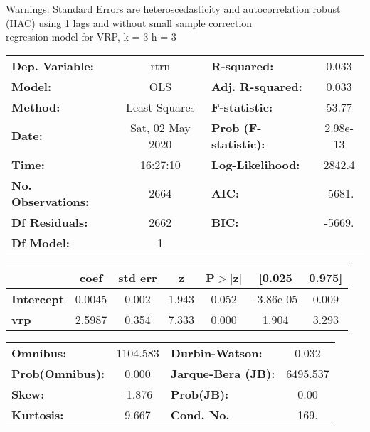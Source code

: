 Warnings: \newline
 [1] Standard Errors are heteroscedasticity and autocorrelation robust (HAC) using 1 lags and without small sample correction\\ 

regression model for VRP, k = 3 h = 3\begin{center}
\begin{tabular}{lclc}
\toprule
\textbf{Dep. Variable:}    &       rtrn       & \textbf{  R-squared:         } &     0.033   \\
\textbf{Model:}            &       OLS        & \textbf{  Adj. R-squared:    } &     0.033   \\
\textbf{Method:}           &  Least Squares   & \textbf{  F-statistic:       } &     53.77   \\
\textbf{Date:}             & Sat, 02 May 2020 & \textbf{  Prob (F-statistic):} &  2.98e-13   \\
\textbf{Time:}             &     16:27:10     & \textbf{  Log-Likelihood:    } &    2842.4   \\
\textbf{No. Observations:} &        2664      & \textbf{  AIC:               } &    -5681.   \\
\textbf{Df Residuals:}     &        2662      & \textbf{  BIC:               } &    -5669.   \\
\textbf{Df Model:}         &           1      & \textbf{                     } &             \\
\bottomrule
\end{tabular}
\begin{tabular}{lcccccc}
                   & \textbf{coef} & \textbf{std err} & \textbf{z} & \textbf{P$> |$z$|$} & \textbf{[0.025} & \textbf{0.975]}  \\
\midrule
\textbf{Intercept} &       0.0045  &        0.002     &     1.943  &         0.052        &    -3.86e-05    &        0.009     \\
\textbf{vrp}       &       2.5987  &        0.354     &     7.333  &         0.000        &        1.904    &        3.293     \\
\bottomrule
\end{tabular}
\begin{tabular}{lclc}
\textbf{Omnibus:}       & 1104.583 & \textbf{  Durbin-Watson:     } &    0.032  \\
\textbf{Prob(Omnibus):} &   0.000  & \textbf{  Jarque-Bera (JB):  } & 6495.537  \\
\textbf{Skew:}          &  -1.876  & \textbf{  Prob(JB):          } &     0.00  \\
\textbf{Kurtosis:}      &   9.667  & \textbf{  Cond. No.          } &     169.  \\
\bottomrule
\end{tabular}
\end{center}

